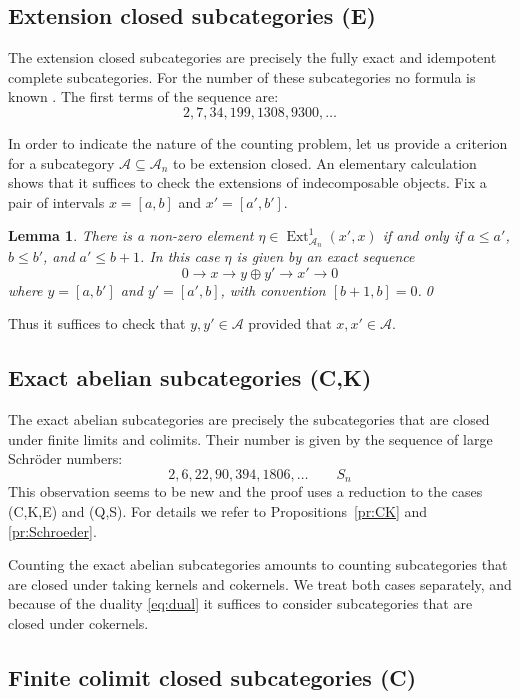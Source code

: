 \documentclass[a4paper]{amsart}
\theoremstyle{plain}
\newtheorem{lem}[thm]{Lemma}
\theoremstyle{definition}
\theoremstyle{remark}
\numberwithin{equation}{section}
\newcommand{\Ext}{\operatorname{Ext}}
\newcommand{\lto}{\longrightarrow}
\def\A{\mathcal A}
\begin{document}
\subsection*{Extension closed subcategories (E)}

The extension closed subcategories are precisely the fully exact and
idempotent complete subcategories. For the number of these
subcategories no formula is known \cite{OEIS}. The first terms of
the sequence are:
\[2, 7, 34, 199, 1308, 9300,\ldots \tag*{$\#(E)$}\]

In order to indicate the nature of the counting problem, let us
provide a criterion for a subcategory $\A\subseteq\A_n$ to be
extension closed. An elementary calculation shows that it suffices to
check the extensions of indecomposable objects. Fix a pair of
intervals $x=[a,b]$ and $x'=[a',b']$.

\begin{lem}\label{le:ext}
There is a non-zero element $\eta\in\Ext_{\A_n}^1(x',x)$ if and
only if $a\le a'$, $b\le b'$, and $a'\le b+1$. In this case $\eta$ is given by
an exact sequence
\[0\lto x\lto y\oplus y'\lto x'\lto 0\]
where $y=[a,b']$ and  $y'=[a',b]$, with convention $[b+1,b]=0$.\qed
\end{lem}
Thus it suffices to check that $ y, y'\in\A$ provided that
$x,x'\in\A$. 

\subsection*{Exact abelian subcategories (C,K)}

The exact abelian subcategories are precisely the subcategories that
are closed under finite limits and colimits. Their number is given by
the sequence of large Schröder numbers:
\[ 2, 6, 22, 90, 394, 1806, \ldots \qquad S_{n}\tag*{$\#(C,K)$}\] This
observation seems to be new and the proof uses a reduction to the
cases (C,K,E) and (Q,S). For details we refer to
Propositions~\ref{pr:CK} and \ref{pr:Schroeder}.

Counting the exact  abelian subcategories amounts to counting
subcategories that are closed under taking kernels and cokernels. We
treat both cases separately, and because of the duality
\eqref{eq:dual} it suffices to
consider subcategories that are closed under cokernels.

\subsection*{Finite colimit closed subcategories (C)}
\end{document}
